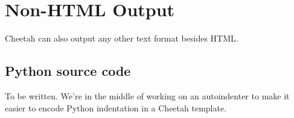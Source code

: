\section{Non-HTML Output}
\label{nonHTML}

Cheetah can also output any other text format besides HTML.

\subsection{Python source code}
\label{nonHTML.python}

To be written.  We're in the middle of working on an autoindenter to
make it easier to encode Python indentation in a Cheetah template.

